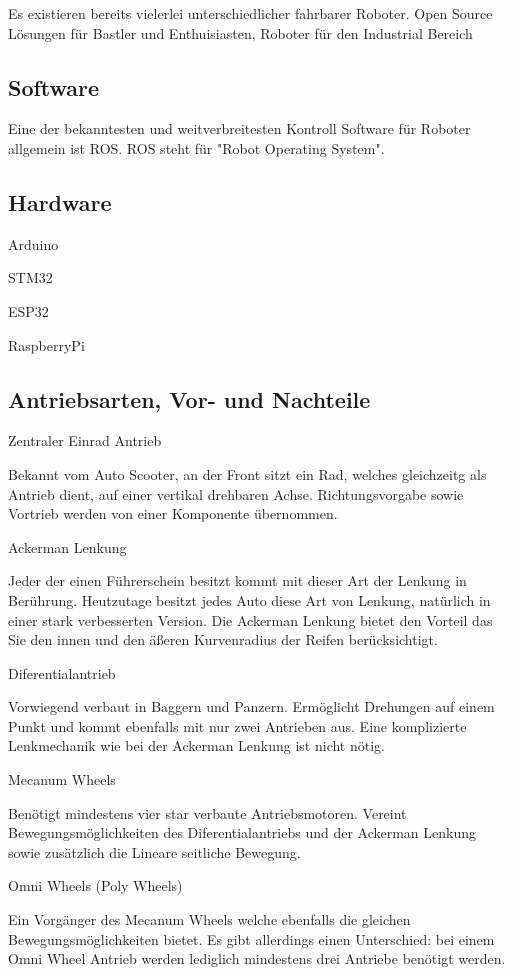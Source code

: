 Es existieren bereits vielerlei unterschiedlicher fahrbarer Roboter.
Open Source Lösungen für Bastler und Enthuisiasten, Roboter für den Industrial Bereich

\subsection{Software}
Eine der bekanntesten und weitverbreitesten Kontroll Software für Roboter allgemein ist ROS.
ROS steht für "Robot Operating System".


\subsection{Hardware}
Arduino

STM32

ESP32

RaspberryPi

\subsection{Antriebsarten, Vor- und Nachteile}

\begin{flushleft}
Zentraler Einrad Antrieb

Bekannt vom Auto Scooter, an der Front sitzt ein Rad, welches gleichzeitg 
als Antrieb dient, auf einer vertikal drehbaren Achse.
Richtungsvorgabe sowie Vortrieb werden von einer Komponente übernommen.
\end{flushleft}

\begin{flushleft}
Ackerman Lenkung

Jeder der einen Führerschein besitzt kommt mit dieser Art der Lenkung in Berührung.
Heutzutage besitzt jedes Auto diese Art von Lenkung, natürlich in einer stark verbesserten Version.
Die Ackerman Lenkung bietet den Vorteil das Sie den innen und den äßeren Kurvenradius der Reifen berücksichtigt.
\end{flushleft}

\begin{flushleft}
Diferentialantrieb

Vorwiegend verbaut in Baggern und Panzern. Ermöglicht Drehungen auf einem Punkt und kommt ebenfalls 
mit nur zwei Antrieben aus. Eine komplizierte Lenkmechanik wie bei der Ackerman Lenkung ist nicht nötig.
\end{flushleft}

\begin{flushleft}
Mecanum Wheels

Benötigt mindestens vier star verbaute Antriebsmotoren. Vereint Bewegungsmöglichkeiten des Diferentialantriebs
und der Ackerman Lenkung sowie zusätzlich die Lineare seitliche Bewegung.
\end{flushleft}

\begin{flushleft}
Omni Wheels (Poly Wheels)

Ein Vorgänger des Mecanum Wheels welche ebenfalls die gleichen Bewegungsmöglichkeiten bietet.
Es gibt allerdings einen Unterschied: bei einem Omni Wheel Antrieb werden lediglich mindestens drei Antriebe benötigt werden.
\end{flushleft}